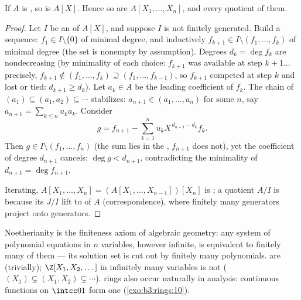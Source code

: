 \begin{theorem}\label{thm:b3:rings:hilbert}
If $A$ is , so is $A[X]$. Hence so are $A[X_1, \dots,
X_n]$, and every quotient of them.
\end{theorem}

\begin{proof}
Let $I$ be an  of $A[X]$, and suppose $I$ is not finitely
generated. Build a sequence: $f_1 \in I \setminus \{0\}$ of
minimal degree, and inductively $f_{k+1} \in I \setminus (f_1,
\dots, f_k)$ of minimal degree (the set is nonempty by
assumption). Degrees $d_k = \deg f_k$ are nondecreasing (by
minimality of each choice: $f_{k+1}$ was available at step
$k+1$... precisely, $f_{k+1} \notin (f_1,\dots,f_k) \supseteq
(f_1, \dots, f_{k-1})$, so $f_{k+1}$ competed at step $k$ and lost
or tied: $d_{k+1} \geq d_k$). Let $a_k \in A$ be the leading
coefficient of $f_k$. The chain of  $(a_1) \subseteq (a_1,
a_2) \subseteq \cdots$ stabilizes: $a_{n+1} \in (a_1, \dots,
a_n)$ for some $n$, say $a_{n+1} = \sum_{k\leq n} u_k a_k$.
Consider
\[
g = f_{n+1} - \sum_{k=1}^{n} u_k X^{\,d_{n+1} - d_k} f_k .
\]
Then $g \in I \setminus (f_1, \dots, f_n)$ (the sum lies in the
, $f_{n+1}$ does not), yet the coefficient of degree
$d_{n+1}$ cancels: $\deg g < d_{n+1}$, contradicting the
minimality of $d_{n+1} = \deg f_{n+1}$.

Iterating, $A[X_1, \dots, X_n] = (A[X_1, \dots, X_{n-1}])[X_n]$
is ; a quotient $A/I$ is  because its 
$J/I$ lift to  of $A$ (correspondence), where finitely many
generators project onto generators.
\end{proof}

\begin{remark}\label{rem:b3:rings:noethmeaning}
Noetherianity is the finiteness axiom of algebraic geometry: any
system of polynomial equations in $n$ variables, however infinite,
is equivalent to finitely many of them --- its solution set is cut
out by finitely many polynomials.  are 
(trivially); $\Z[X_1, X_2, \dots]$ in infinitely many variables
is not ($(X_1) \subsetneq (X_1, X_2) \subsetneq \cdots$).
 rings also occur naturally in analysis: continuous
functions on $\intcc01$ form one (\cref{exo:b3:rings:10}).
\end{remark}

